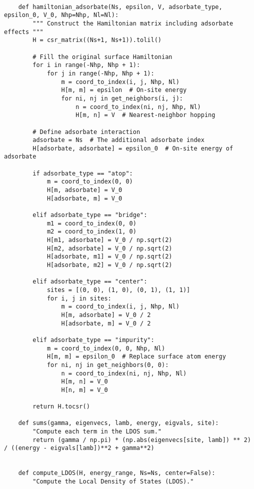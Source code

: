 \begin{verbatim}
    
    def hamiltonian_adsorbate(Ns, epsilon, V, adsorbate_type, epsilon_0, V_0, Nhp=Nhp, Nl=Nl):
        """ Construct the Hamiltonian matrix including adsorbate effects """
        H = csr_matrix((Ns+1, Ns+1)).tolil()
        
        # Fill the original surface Hamiltonian
        for i in range(-Nhp, Nhp + 1):
            for j in range(-Nhp, Nhp + 1):
                m = coord_to_index(i, j, Nhp, Nl)
                H[m, m] = epsilon  # On-site energy
                for ni, nj in get_neighbors(i, j):
                    n = coord_to_index(ni, nj, Nhp, Nl)
                    H[m, n] = V  # Nearest-neighbor hopping
        
        # Define adsorbate interaction
        adsorbate = Ns  # The additional adsorbate index
        H[adsorbate, adsorbate] = epsilon_0  # On-site energy of adsorbate
        
        if adsorbate_type == "atop":
            m = coord_to_index(0, 0)
            H[m, adsorbate] = V_0
            H[adsorbate, m] = V_0
        
        elif adsorbate_type == "bridge":
            m1 = coord_to_index(0, 0)
            m2 = coord_to_index(1, 0)
            H[m1, adsorbate] = V_0 / np.sqrt(2)
            H[m2, adsorbate] = V_0 / np.sqrt(2)
            H[adsorbate, m1] = V_0 / np.sqrt(2)
            H[adsorbate, m2] = V_0 / np.sqrt(2)
        
        elif adsorbate_type == "center":
            sites = [(0, 0), (1, 0), (0, 1), (1, 1)]
            for i, j in sites:
                m = coord_to_index(i, j, Nhp, Nl)
                H[m, adsorbate] = V_0 / 2
                H[adsorbate, m] = V_0 / 2
        
        elif adsorbate_type == "impurity":
            m = coord_to_index(0, 0, Nhp, Nl)
            H[m, m] = epsilon_0  # Replace surface atom energy
            for ni, nj in get_neighbors(0, 0):
                n = coord_to_index(ni, nj, Nhp, Nl)
                H[m, n] = V_0
                H[n, m] = V_0
        
        return H.tocsr()
    
    def sums(gamma, eigenvecs, lamb, energy, eigvals, site):
        "Compute each term in the LDOS sum."
        return (gamma / np.pi) * (np.abs(eigenvecs[site, lamb]) ** 2) / ((energy - eigvals[lamb])**2 + gamma**2)
    
    
    def compute_LDOS(H, energy_range, Ns=Ns, center=False):
        "Compute the Local Density of States (LDOS)."
        

\end{verbatim}
